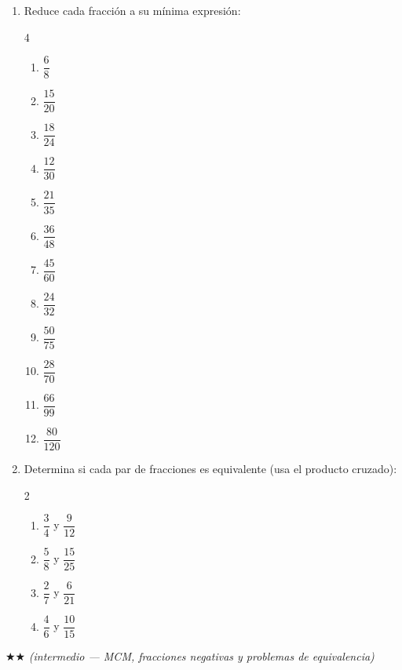 \documentclass[11pt, letterpaper]{article}
\begin{document}
\begin{enumerate}[label=\textbf{\arabic*.}, leftmargin=*]
\item Reduce cada fracci\'on a su m\'inima expresi\'on:
\begin{multicols}{4}
\begin{enumerate}[label=\alph*)]
  \item $\dfrac{6}{8}$ \item $\dfrac{15}{20}$ \item $\dfrac{18}{24}$
  \item $\dfrac{12}{30}$ \item $\dfrac{21}{35}$ \item $\dfrac{36}{48}$
  \item $\dfrac{45}{60}$ \item $\dfrac{24}{32}$ \item $\dfrac{50}{75}$
  \item $\dfrac{28}{70}$ \item $\dfrac{66}{99}$ \item $\dfrac{80}{120}$
\end{enumerate}
\end{multicols}

\item Determina si cada par de fracciones es equivalente (usa el producto cruzado):
\begin{multicols}{2}
\begin{enumerate}[label=\alph*)]
  \item $\dfrac{3}{4}$ y $\dfrac{9}{12}$
  \item $\dfrac{5}{8}$ y $\dfrac{15}{25}$
  \item $\dfrac{2}{7}$ y $\dfrac{6}{21}$
  \item $\dfrac{4}{6}$ y $\dfrac{10}{15}$
\end{enumerate}
\end{multicols}

\end{enumerate}

$\bigstar\bigstar$ \textit{(intermedio --- MCM, fracciones negativas y problemas de equivalencia)}
\end{document}
